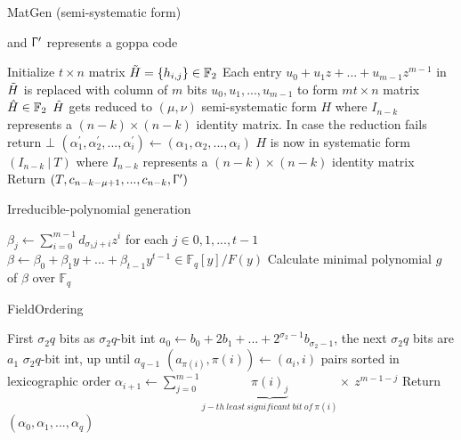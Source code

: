 \documentclass[11pt,
  oneside,openany,    %
]{scrreprt}
\begin{document}
\begin{algorithm}[H]
\caption{MatGen (semi-systematic form)}\label{alg:MatGen-semi}
 and $\Upgamma^{\prime}$ represents a goppa code 

Initialize $t \times n$ matrix $\Tilde{H} = \{h_{i,j}\} \in \mathbb{F}_{2}$\;
Each entry $u_{0} + u_{1}z + ...+ u_{m-1}z^{m-1}$ in $\Tilde{H}$ is replaced with column of $m$ bits $u_{0},u_{1},...,u_{m-1}$ to form $mt \times n$ matrix $\Hat{H} \in  \mathbb{F}_{2}$\;
$\Hat{H}$ gets reduced to $(\mu, \nu)$ semi-systematic form $H$ where $I_{n-k}$ represents a $(n-k) \times (n-k)$ identity matrix. In case the reduction fails return $\bot$\;
$(\alpha^{\prime}_{1}, \alpha^{\prime}_{2},..., \alpha^{\prime}_{i}) \gets (\alpha_{1}, \alpha_{2},..., \alpha_{i})$\;
$H$ is now in systematic form $(I_{n-k} \ | \ T)$ where $I_{n-k}$ represents a $(n-k) \times (n-k)$ identity matrix\;
Return $(T, c_{n-k-\mu+1},...,c_{n-k}, \Upgamma^{\prime})$\;
\end{algorithm}

\begin{algorithm}[H]
\caption{Irreducible-polynomial generation}\label{alg:irreducible}
$\beta_{j} \gets \sum^{m-1}_{i=0} d_{\sigma_{1}j+i}z^{i}$ for each $j \in {0,1,...,t-1}$\;
$\beta \gets \beta_{0} + \beta_{1}y + ... + \beta_{t-1}y^{t-1} \in \mathbb{F}_{q} [y] / F(y)$\;
Calculate minimal polynomial $g$ of $\beta$ over $\mathbb{F}_{q}$\;
\end{algorithm}

\begin{algorithm}[H]
\caption{FieldOrdering}\label{alg:fieldOrdering}
First $\sigma_{2}q$ bits as $\sigma_{2}q$-bit int $a_{0} \gets b_{0}+2b_{1}+ ... + 2^{\sigma_{2}-1}b_{\sigma_{2}-1}$, the next $\sigma_{2}q$ bits are $a_{1}$ $\sigma_{2}q$-bit int, up until $a_{q-1}$\;
$(a_{\pi(i)}, \pi(i)) \gets (a_{i},i)$ pairs sorted in lexicographic order 
$\alpha_{i+1} \gets \sum_{j=0}^{m-1} \underbrace{\pi(i)_{j}}_{j-th \ least \ significant \ bit \ of \ \pi(i)} \times \ z^{m-1-j}$\;
Return $(\alpha_{0},\alpha_{1},...,\alpha_{q})$
\end{algorithm}
\end{document}
